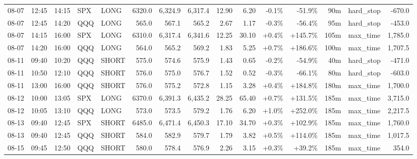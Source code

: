 \documentclass[11pt,a4paper,twoside]{article}
\begin{document}
\begin{landscape}
\begin{center}
\begin{longtable}{>{\color{txtmain}}l l l l l r r r r r r r r >{\color{txtmain}}l r}
08-07 & 12:45 & 14:15 & SPX & LONG & 6320.0 & 6,324.9 & 6,317.4 & 12.90 & 6.20 & \textcolor{lossred}{-0.1\%} & \textcolor{lossred}{-51.9\%} & 90m & hard\_stop & \textcolor{lossred}{-670.0} \\
08-07 & 12:45 & 14:20 & QQQ & LONG & 565.0 & 567.1 & 565.2 & 2.67 & 1.17 & \textcolor{lossred}{-0.3\%} & \textcolor{lossred}{-56.4\%} & 95m & hard\_stop & \textcolor{lossred}{-453.0} \\
08-07 & 14:15 & 16:00 & SPX & LONG & 6310.0 & 6,317.4 & 6,341.6 & 12.25 & 30.10 & \textcolor{wingreen}{+0.4\%} & \textcolor{wingreen}{+145.7\%} & 105m & max\_time & \textcolor{wingreen}{1,785.0} \\
08-07 & 14:20 & 16:00 & QQQ & LONG & 564.0 & 565.2 & 569.2 & 1.83 & 5.25 & \textcolor{wingreen}{+0.7\%} & \textcolor{wingreen}{+186.6\%} & 100m & max\_time & \textcolor{wingreen}{1,707.5} \\
08-11 & 09:40 & 10:20 & QQQ & SHORT & 575.0 & 574.6 & 575.9 & 1.43 & 0.65 & \textcolor{lossred}{-0.2\%} & \textcolor{lossred}{-54.9\%} & 40m & hard\_stop & \textcolor{lossred}{-471.0} \\
08-11 & 10:50 & 12:10 & QQQ & SHORT & 576.0 & 575.0 & 576.7 & 1.52 & 0.52 & \textcolor{lossred}{-0.3\%} & \textcolor{lossred}{-66.1\%} & 80m & hard\_stop & \textcolor{lossred}{-603.0} \\
08-11 & 13:00 & 16:00 & QQQ & SHORT & 576.0 & 575.2 & 572.8 & 1.15 & 3.28 & \textcolor{wingreen}{+0.4\%} & \textcolor{wingreen}{+184.8\%} & 180m & max\_time & \textcolor{wingreen}{1,700.0} \\
08-12 & 10:00 & 13:05 & SPX & LONG & 6370.0 & 6,391.3 & 6,435.2 & 28.25 & 65.40 & \textcolor{wingreen}{+0.7\%} & \textcolor{wingreen}{+131.5\%} & 185m & max\_time & \textcolor{wingreen}{3,715.0} \\
08-12 & 10:05 & 13:10 & QQQ & LONG & 573.0 & 573.5 & 579.2 & 1.76 & 6.20 & \textcolor{wingreen}{+1.0\%} & \textcolor{wingreen}{+252.0\%} & 185m & max\_time & \textcolor{wingreen}{2,217.5} \\
08-13 & 09:40 & 12:45 & SPX & SHORT & 6485.0 & 6,471.4 & 6,450.3 & 17.10 & 34.70 & \textcolor{wingreen}{+0.3\%} & \textcolor{wingreen}{+102.9\%} & 185m & max\_time & \textcolor{wingreen}{1,760.0} \\
08-13 & 09:40 & 12:45 & QQQ & SHORT & 584.0 & 582.9 & 579.7 & 1.79 & 3.82 & \textcolor{wingreen}{+0.5\%} & \textcolor{wingreen}{+114.0\%} & 185m & max\_time & \textcolor{wingreen}{1,017.5} \\
08-15 & 09:45 & 12:50 & QQQ & SHORT & 580.0 & 578.4 & 576.9 & 2.26 & 3.15 & \textcolor{wingreen}{+0.3\%} & \textcolor{wingreen}{+39.2\%} & 185m & max\_time & \textcolor{wingreen}{354.0} \\

\end{longtable}
\end{center}
\end{landscape}
\end{document}
